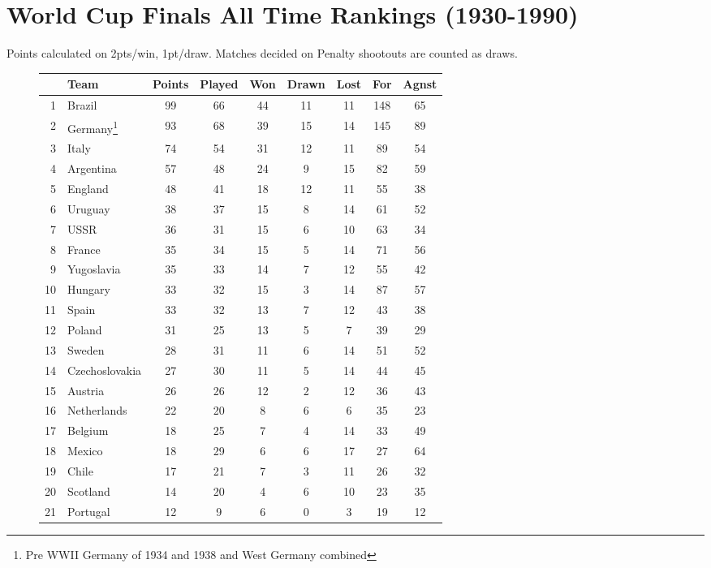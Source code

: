 \chapter{World Cup Finals All Time Rankings (1930-1990)}
\newline
\newline
Points calculated on 2pts/win, 1pt/draw.
Matches decided on Penalty shootouts are counted as draws.
\begin{figure}[H]
\small
\begin{tabular}{r l c c c c c c c}
& Team & Points & Played & Won & Drawn & Lost & For & Agnst \\ \hline
1 & Brazil & 99 & 66 & 44 & 11 & 11 & 148 & 65 \\
2 & Germany\footnote{Pre WWII Germany of 1934 and 1938 and West Germany combined} & 93 & 68 & 39 & 15 & 14 & 145 & 89 \\
3 & Italy & 74 & 54 & 31 & 12 & 11 & 89 & 54 \\
4 & Argentina & 57 & 48 & 24 & 9 & 15 & 82 & 59 \\
5 & England & 48 & 41 & 18 & 12 & 11 & 55 & 38 \\
6 & Uruguay & 38 & 37 & 15 & 8 & 14 & 61 & 52 \\
7 & USSR & 36 & 31 & 15 & 6 & 10 & 63 & 34 \\
8 & France & 35 & 34 & 15 & 5 & 14 & 71 & 56 \\
9 & Yugoslavia & 35 & 33 & 14 & 7 & 12 & 55 & 42 \\
10 & Hungary & 33 & 32 & 15 & 3 & 14 & 87 & 57 \\
11 & Spain & 33 & 32 & 13 & 7 & 12 & 43 & 38 \\
12 & Poland & 31 & 25 & 13 & 5 & 7 & 39 & 29 \\
13 & Sweden & 28 & 31 & 11 & 6 & 14 & 51 & 52 \\
14 & Czechoslovakia & 27 & 30 & 11 & 5 & 14 & 44 & 45 \\
15 & Austria & 26 & 26 & 12 & 2 & 12 & 36 & 43 \\
16 & Netherlands & 22 & 20 & 8 & 6 & 6 & 35 & 23 \\
17 & Belgium & 18 & 25 & 7 & 4 & 14 & 33 & 49 \\
18 & Mexico & 18 & 29 & 6 & 6 & 17 & 27 & 64 \\
19 & Chile & 17 & 21 & 7 & 3 & 11 & 26 & 32 \\
20 & Scotland & 14 & 20 & 4 & 6 & 10 & 23 & 35 \\
21 & Portugal & 12 & 9 & 6 & 0 & 3 & 19 & 12 \\

\end{tabular}
\end{figure}
